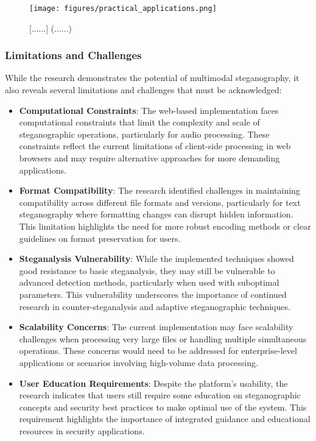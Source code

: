 \documentclass[12pt, a4paper, oneside]{book}
\begin{document}
\begin{figure}[htbp]
    \centering
    \texttt{[image: figures/practical\_applications.png]}
    \caption{[......] (......)}
    \label{fig:practical_applications}
\end{figure}

\subsubsection{Limitations and Challenges}

While the research demonstrates the potential of multimodal steganography, it also reveals several limitations and challenges that must be acknowledged:

\begin{itemize}[leftmargin=*]
    \item \textbf{Computational Constraints}: The web-based implementation faces computational constraints that limit the complexity and scale of steganographic operations, particularly for audio processing. These constraints reflect the current limitations of client-side processing in web browsers and may require alternative approaches for more demanding applications.

    \item \textbf{Format Compatibility}: The research identified challenges in maintaining compatibility across different file formats and versions, particularly for text steganography where formatting changes can disrupt hidden information. This limitation highlights the need for more robust encoding methods or clear guidelines on format preservation for users.

    \item \textbf{Steganalysis Vulnerability}: While the implemented techniques showed good resistance to basic steganalysis, they may still be vulnerable to advanced detection methods, particularly when used with suboptimal parameters. This vulnerability underscores the importance of continued research in counter-steganalysis and adaptive steganographic techniques.

    \item \textbf{Scalability Concerns}: The current implementation may face scalability challenges when processing very large files or handling multiple simultaneous operations. These concerns would need to be addressed for enterprise-level applications or scenarios involving high-volume data processing.

    \item \textbf{User Education Requirements}: Despite the platform's usability, the research indicates that users still require some education on steganographic concepts and security best practices to make optimal use of the system. This requirement highlights the importance of integrated guidance and educational resources in security applications.
\end{itemize}
\end{document}
